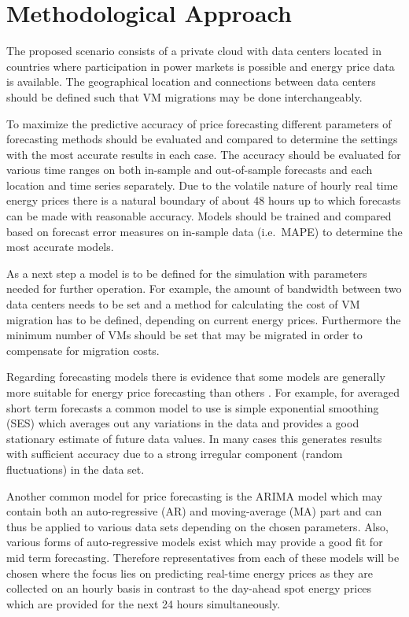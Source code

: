 \section{Methodological Approach}

The proposed scenario consists of a private cloud with data centers located in countries where participation in power markets is possible and energy price data is available. The geographical location and connections between data centers should be defined such that VM migrations may be done interchangeably. 

To maximize the predictive accuracy of price forecasting different parameters of forecasting methods should be evaluated and compared to determine the settings with the most accurate results in each case. The accuracy should be evaluated for various time ranges on both in-sample and out-of-sample forecasts and each location and time series separately. Due to the volatile nature of hourly real time energy prices there is a natural boundary of about 48 hours up to which forecasts can be made with reasonable accuracy. Models should be trained and compared based on forecast error measures on in-sample data (i.e.~MAPE) to determine the most accurate models. 

As a next step a model is to be defined for the simulation with parameters needed for further operation. For example, the amount of bandwidth between two data centers needs to be set and a method for calculating the cost of VM migration has to be defined, depending on current energy prices. Furthermore the minimum number of VMs should be set that may be migrated in order to compensate for migration costs. 

Regarding forecasting models there is evidence that some models are generally more suitable for energy price forecasting than others \cite{weron2008forecasting}\cite{weron2005forecasting}. For example, for averaged short term forecasts a common model to use is simple exponential smoothing (SES) which averages out any variations in the data and provides a good stationary estimate of future data values. In many cases this generates results with sufficient accuracy due to a strong irregular component (random fluctuations) in the data set. 

Another common model for price forecasting is the ARIMA model which may contain both an auto-regressive (AR) and moving-average (MA) part and can thus be applied to various data sets depending on the chosen parameters. Also, various forms of auto-regressive models exist which may provide a good fit for mid term forecasting. 
Therefore representatives from each of these models will be chosen where the focus lies on predicting real-time energy prices as they are collected on an hourly basis in contrast to the day-ahead spot energy prices which are provided for the next 24 hours simultaneously. 

